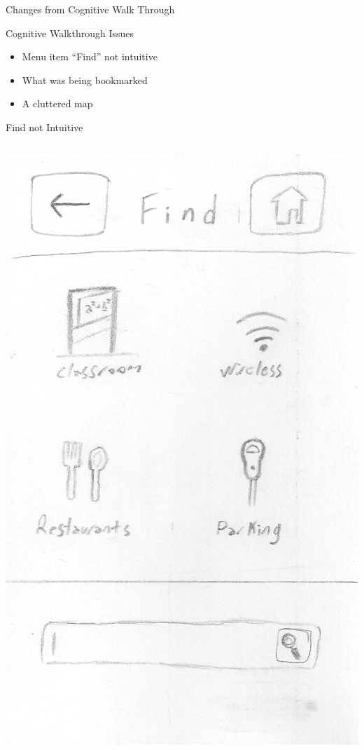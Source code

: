 \documentclass{beamer}
\begin{document}
\begin{frame}{Changes from Cognitive Walk Through}
    \begin{block}{Cognitive Walkthrough Issues} 
    \begin{itemize}
        \item Menu item ``Find'' not intuitive
        \item What was being bookmarked
        \item A cluttered map
    \end{itemize}
    \end{block}
\end{frame}

\begin{frame}{Find not Intuitive}
    \begin{columns}[c]
	    \center\includegraphics[height=0.5 \textheight]{hand-drawn/find.png}

\end{columns}
\end{frame}
\end{document}
